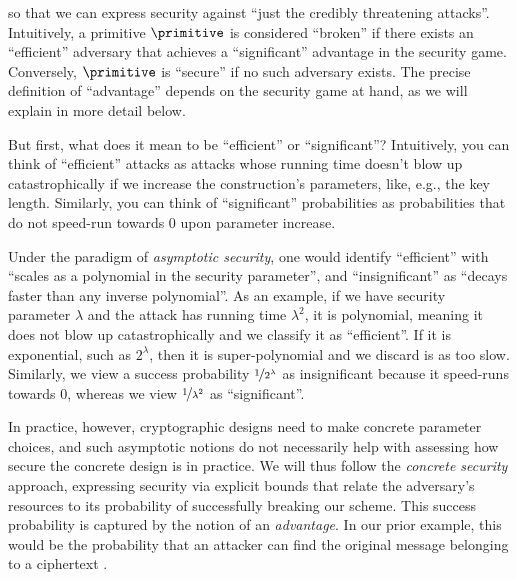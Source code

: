         so that we can express security against ``just the credibly threatening attacks''.
        Intuitively, a primitive $\primitive$ is considered ``broken'' if there exists an
          ``efficient'' adversary 
	        that achieves a ``significant'' advantage in the security game.
	        Conversely, $\primitive$ is ``secure'' if no such adversary exists.
	        The precise definition of ``advantage'' depends on the security game at hand,
	        as we will explain in more detail below.
	        
	    But first, what does it mean to be ``efficient'' or ``significant''?
	        Intuitively, you can think of ``efficient'' attacks as attacks whose running time doesn't blow up catastrophically
	    	if we increase the construction's parameters, like, e.g., the key length.
	    	Similarly, you can think of ``significant'' probabilities as probabilities that do not speed-run towards 0
	    	  upon parameter increase.

        Under the paradigm of \emph{asymptotic security}, one would identify
          ``efficient'' with ``scales as a polynomial in the security
          parameter'', and ``insignificant'' as ``decays faster than any inverse polynomial''.
          As an example, if we have security parameter $\lambda$
          and the attack has running time $\lambda^2$,
          it is polynomial, meaning it does not blow up catastrophically and we classify it as ``efficient''.
          If it is exponential, such as $2^\lambda$,
          then it is super-polynomial and we discard is as too slow.
          Similarly, we view a success probability $\nicefrac{1}{2^\lambda}$ as insignificant because it speed-runs towards 0,
          whereas we view $\nicefrac{1}{\lambda^2}$ as ``significant''.
        
        In practice, however, cryptographic designs need to
          make concrete parameter choices,
	        and such asymptotic notions do not necessarily help with assessing how secure the concrete design is in practice.
	        We will thus follow the \emph{concrete security} approach, 
          expressing security via explicit bounds that relate the adversary’s
          resources to its probability of successfully breaking our scheme.
          This success probability is captured by the notion of an \emph{advantage}.
          In our prior example, this would be the probability that an attacker can find the original
          message \chalmssg belonging to a ciphertext \chalctxt.
          
